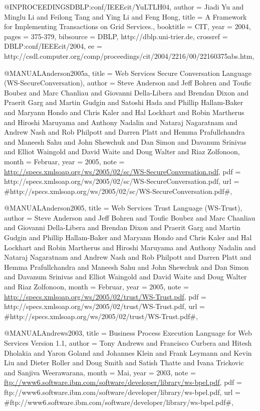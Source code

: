 @INPROCEEDINGS{DBLP:conf/IEEEcit/YuLTLH04,
  author = {Jiadi Yu and Minglu Li and Feilong Tang and Ying Li and Feng Hong},
  title = {{A Framework for Implementing Transactions on Grid Services.}},
  booktitle = {CIT},
  year = {2004},
  pages = {375-379},
  bibsource = {DBLP, http://dblp.uni-trier.de},
  crossref = {DBLP:conf/IEEEcit/2004},
  ee = {http://csdl.computer.org/comp/proceedings/cit/2004/2216/00/22160375abs.htm},
}

@MANUAL{Anderson2005a,
  title = {{Web Services Secure Conversation Language (WS-SecureConversation)}},
  author = {Steve Anderson and Jeff Bohren and Toufic Boubez and Marc Chanliau
	and Giovanni Della-Libera and Brendan Dixon and Praerit Garg and
	Martin Gudgin and Satoshi Hada and Phillip Hallam-Baker and Maryann
	Hondo and Chris Kaler and Hal Lockhart and Robin Martherus and Hiroshi
	Maruyama and Anthony Nadalin and Nataraj Nagaratnam and Andrew Nash
	and Rob Philpott and Darren Platt and Hemma Prafullchandra and Maneesh
	Sahu and John Shewchuk and Dan Simon and Davanum Srinivas and Elliot
	Waingold and David Waite and Doug Walter and Riaz Zolfonoon},
  month = {Februar},
  year = {2005},
  note = {\url{http://specs.xmlsoap.org/ws/2005/02/sc/WS-SecureConversation.pdf}},
  pdf = {http://specs.xmlsoap.org/ws/2005/02/sc/WS-SecureConversation.pdf},
  url = {#http://specs.xmlsoap.org/ws/2005/02/sc/WS-SecureConversation.pdf#},
}

@MANUAL{Anderson2005,
  title = {{Web Services Trust Language (WS-Trust)}},
  author = {Steve Anderson and Jeff Bohren and Toufic Boubez and Marc Chanliau
	and Giovanni Della-Libera and Brendan Dixon and Praerit Garg and
	Martin Gudgin and Phillip Hallam-Baker and Maryann Hondo and Chris
	Kaler and Hal Lockhart and Robin Martherus and Hiroshi Maruyama and
	Anthony Nadalin and Nataraj Nagaratnam and Andrew Nash and Rob Philpott
	and Darren Platt and Hemma Prafullchandra and Maneesh Sahu and John
	Shewchuk and Dan Simon and Davanum Srinivas and Elliot Waingold and
	David Waite and Doug Walter and Riaz Zolfonoon},
  month = {Februar},
  year = {2005},
  note = {\url{http://specs.xmlsoap.org/ws/2005/02/trust/WS-Trust.pdf}},
  pdf = {http://specs.xmlsoap.org/ws/2005/02/trust/WS-Trust.pdf},
  url = {#http://specs.xmlsoap.org/ws/2005/02/trust/WS-Trust.pdf#},
}

@MANUAL{Andrews2003,
  title = {{Business Process Execution Language for Web Services Version 1.1}},
  author = {Tony Andrews and Francisco Curbera and Hitesh Dholakia and Yaron
	Goland and Johannes Klein and Frank Leymann and Kevin Liu and Dieter
	Roller and Doug Smith and Satish Thatte and Ivana Trickovic and Sanjiva
	Weerawarana},
  month = {Mai},
  year = {2003},
  note = {\url{ftp://www6.software.ibm.com/software/developer/library/ws-bpel.pdf}},
  pdf = {ftp://www6.software.ibm.com/software/developer/library/ws-bpel.pdf},
  url = {#ftp://www6.software.ibm.com/software/developer/library/ws-bpel.pdf#},
}

